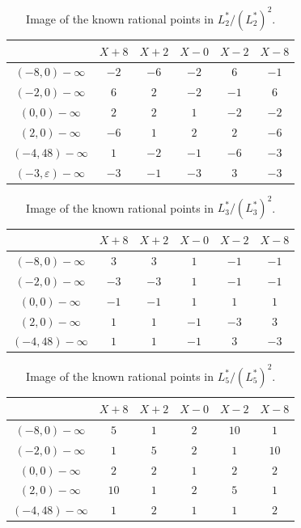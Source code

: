 \documentclass[a4paper, 12pt]{amsart}
\theoremstyle{definition}
\theoremstyle{plain}
\theoremstyle{plain}
\theoremstyle{plain}
\theoremstyle{plain}
\theoremstyle{remark}
\theoremstyle{remark}
\theoremstyle{plain}
\begin{document}
\begin{table}[h!]
	\begin{center}
	\begin{tabular}{c|c|c|c|c|c}
		& $X+8$ & $X+2$ & $X-0$ & $X-2$ & $X-8$\\ \hline
		$(-8,0)-\infty$&$-2$ & $-6$ & $-2$ & $6$ & $-1$\\ \hline
		$(-2,0)-\infty$&$6$ & $2$ & $-2$ & $-1$ & $6$\\ \hline
		$(0,0)-\infty$&$2$ & $2$ & $1$ & $-2$ & $-2$\\ \hline
		$(2,0)-\infty$&$-6$ & $1$ & $2$ & $2$ & $-6$\\ \hline
		$(-4,48)-\infty$&$1$ & $-2$ & $-1$ & $-6$ & $-3$\\ \hline
		$(-3,\varepsilon)-\infty$ &$-3$ & $-1$ & $-3$ & $3$ & $-3$
	\end{tabular}
	\vspace{10pt}
	\caption{Image of the known rational points in $L_2^*/(L_2^*)^2$.}
	\label{tabletwo}
	\end{center}
\end{table}

\begin{table}[h!]
	\begin{center}
	\begin{tabular}{c|c|c|c|c|c}
		& $X+8$ & $X+2$ & $X-0$ & $X-2$ & $X-8$\\ \hline
		$(-8,0)-\infty$&$3$ & $3$ & $1$ & $-1$ & $-1$\\ \hline
		$(-2,0)-\infty$&$-3$ & $-3$ & $1$ & $-1$ & $-1$\\ \hline
		$(0,0)-\infty$&$-1$ & $-1$ & $1$ & $1$ & $1$\\ \hline
		$(2,0)-\infty$&$1$ & $1$ & $-1$ & $-3$ & $3$\\ \hline
		$(-4,48)-\infty$&$1$ & $1$ & $-1$ & $3$ & $-3$
	\end{tabular}
	\vspace{10pt}
	\caption{Image of the known rational points in $L_3^*/(L_3^*)^2$.}
	\label{tablethree}
	\end{center}
\end{table}

\begin{table}[h!]
	\begin{center}
	\begin{tabular}{c|c|c|c|c|c}
		& $X+8$ & $X+2$ & $X-0$ & $X-2$ & $X-8$\\ \hline
		$(-8,0)-\infty$&$5$ & $1$ & $2$ & $10$ & $1$\\ \hline
		$(-2,0)-\infty$&$1$ & $5$ & $2$ & $1$ & $10$\\ \hline
		$(0,0)-\infty$&$2$ & $2$ & $1$ & $2$ & $2$\\ \hline
		$(2,0)-\infty$&$10$ & $1$ & $2$ & $5$ & $1$\\ \hline
		$(-4,48)-\infty$&$1$ & $2$ & $1$ & $1$ & $2$
	\end{tabular}
	\vspace{10pt}
	\caption{Image of the known rational points in $L_5^*/(L_5^*)^2$.}
	\label{tablefive}
	\end{center}
\end{table}
\end{document}
